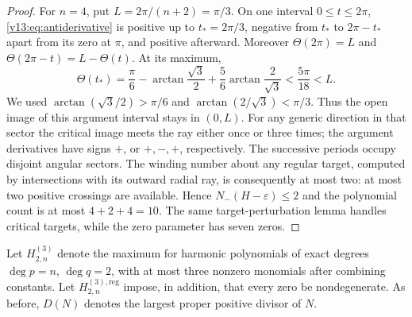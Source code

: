 \documentclass[UTF8,11pt]{ctexart}
\theoremstyle{definition}
\numberwithin{equation}{section}
\begin{document}
\begin{proof}
For $n=4$, put $L=2\pi/(n+2)=\pi/3$. On one interval
$0\le t\le2\pi$, \eqref{v13:eq:antiderivative} is positive
up to $t_*=2\pi/3$, negative from $t_*$ to $2\pi-t_*$
apart from its zero at $\pi$, and positive afterward.
Moreover $\Theta(2\pi)=L$ and
$\Theta(2\pi-t)=L-\Theta(t)$. At its maximum,
\[
 \Theta(t_*)=
 \frac\pi6-\arctan\frac{\sqrt3}{2}
 +\frac56\arctan\frac{2}{\sqrt3}
 <\frac{5\pi}{18}<L.
\]
We used $\arctan(\sqrt3/2)>\pi/6$ and
$\arctan(2/\sqrt3)<\pi/3$.
Thus the open image of this argument interval stays in $(0,L)$.
For any generic direction in that sector the critical image
meets the ray either once or three times; the argument
derivatives have signs $+$, or $+,-,+$, respectively.
The successive periods occupy disjoint angular sectors.
The winding number about any regular target, computed by
intersections with its outward radial ray, is consequently
at most two: at most two positive crossings are available.
Hence $N_-(H-\varepsilon)\le2$ and the polynomial count is
at most $4+2+4=10$. The same target-perturbation lemma handles
critical targets, while the zero parameter has seven zeros.
\end{proof}

Let $H^{(3)}_{2,n}$ denote the maximum for harmonic polynomials
of exact degrees $\deg p=n$, $\deg q=2$, with at most three
nonzero monomials after combining constants. Let
$H^{(3),\mathrm{reg}}_{2,n}$ impose, in addition, that every
zero be nondegenerate. As before, $D(N)$ denotes the largest
proper positive divisor of $N$.
\end{document}
